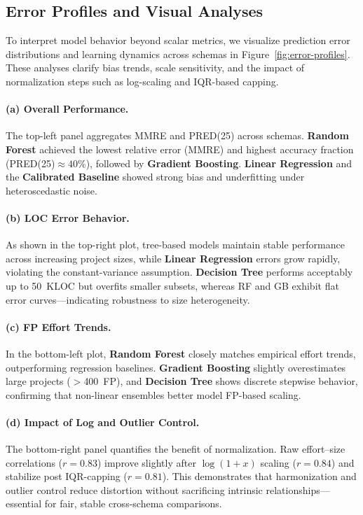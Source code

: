 \documentclass{ieeeaccess}
\begin{document}
\subsection{Error Profiles and Visual Analyses}


To interpret model behavior beyond scalar metrics, 
we visualize prediction error distributions and learning dynamics 
across schemas in Figure~\ref{fig:error-profiles}.  
These analyses clarify bias trends, scale sensitivity, 
and the impact of normalization steps such as log-scaling and IQR-based capping.

\paragraph{(a) Overall Performance.}
The top-left panel aggregates MMRE and PRED(25) across schemas.  
\textbf{Random Forest} achieved the lowest relative error (MMRE) 
and highest accuracy fraction (PRED(25)$\approx40\%$), 
followed by \textbf{Gradient Boosting}.  
\textbf{Linear Regression} and the \textbf{Calibrated Baseline} showed 
strong bias and underfitting under heteroscedastic noise.

\paragraph{(b) LOC Error Behavior.}
As shown in the top-right plot, tree-based models maintain 
stable performance across increasing project sizes, 
while \textbf{Linear Regression} errors grow rapidly, 
violating the constant-variance assumption.  
\textbf{Decision Tree} performs acceptably up to 50~KLOC 
but overfits smaller subsets, whereas RF and GB exhibit 
flat error curves—indicating robustness to size heterogeneity.

\paragraph{(c) FP Effort Trends.}
In the bottom-left plot, \textbf{Random Forest} closely matches 
empirical effort trends, outperforming regression baselines.  
\textbf{Gradient Boosting} slightly overestimates large projects ($>$400~FP), 
and \textbf{Decision Tree} shows discrete stepwise behavior, 
confirming that non-linear ensembles better model FP-based scaling.

\paragraph{(d) Impact of Log and Outlier Control.}
The bottom-right panel quantifies the benefit of normalization.  
Raw effort–size correlations ($r=0.83$) improve slightly after $\log(1+x)$ scaling ($r=0.84$) 
and stabilize post IQR-capping ($r=0.81$).  
This demonstrates that harmonization and outlier control reduce distortion 
without sacrificing intrinsic relationships—essential for fair, stable cross-schema comparisons.
\end{document}
